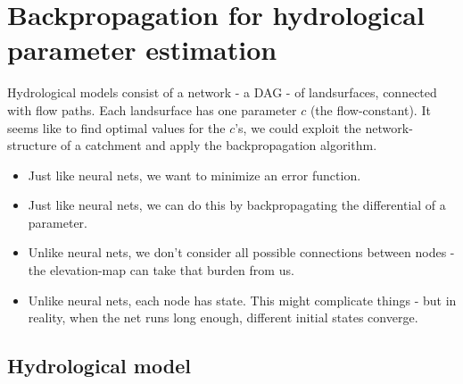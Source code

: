 \section{Backpropagation for hydrological parameter estimation}

Hydrological models consist of a network - a DAG - of landsurfaces, connected with flow paths. Each landsurface has one parameter $c$ (the flow-constant). 
It seems like to find optimal values for the $c$'s, we could exploit the network-structure of a catchment and apply the backpropagation algorithm.

\begin{itemize}
	\item Just like neural nets, we want to minimize an error function.
	\item Just like neural nets, we can do this by backpropagating the differential of a parameter. 
	\item Unlike neural nets, we don't consider all possible connections between nodes - the elevation-map can take that burden from us.
	\item Unlike neural nets, each node has state. This might complicate things - but in reality, when the net runs long enough, different initial states converge.
\end{itemize}


\subsection{Hydrological model}


